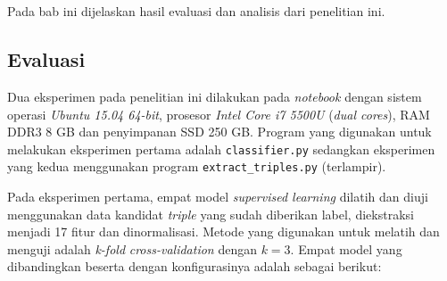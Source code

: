 \chapter{\babEmpat}
\label{chap:babEmpat}

Pada bab ini dijelaskan hasil evaluasi dan analisis dari penelitian ini.

\section{Evaluasi}

Dua eksperimen pada penelitian ini dilakukan pada \textit{notebook} dengan sistem operasi \textit{Ubuntu 15.04 64-bit}, prosesor \textit{Intel Core i7 5500U} (\textit{dual cores}), RAM DDR3 8 GB dan penyimpanan SSD 250 GB. Program yang digunakan untuk melakukan eksperimen pertama adalah \verb|classifier.py| sedangkan eksperimen yang kedua menggunakan program \verb|extract_triples.py| (terlampir).

Pada eksperimen pertama, empat model \textit{supervised learning} dilatih dan diuji menggunakan data kandidat \textit{triple} yang sudah diberikan label, diekstraksi menjadi 17 fitur dan dinormalisasi. Metode yang digunakan untuk melatih dan menguji adalah \textit{k-fold} \textit{cross-validation} \citep{kohavi1995study} dengan $k = 3$. Empat model yang dibandingkan beserta dengan konfigurasinya adalah sebagai berikut:

